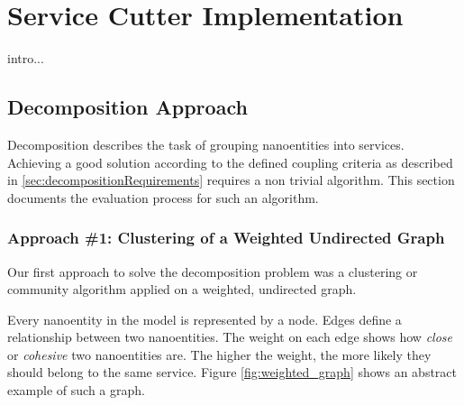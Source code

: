 
\chapter{Service Cutter Implementation}
\label{cha:implementation}

intro...


\section{Decomposition Approach}

Decomposition describes the task of grouping nanoentities into services. Achieving a good solution according to the defined coupling criteria as described in \ref{sec:decompositionRequirements} requires a non trivial algorithm. This section documents the evaluation process for such an algorithm.

\subsection{Approach \#1: Clustering of a Weighted Undirected Graph}
\label{subsec:approach1_graph}

Our first approach to solve the decomposition problem was a clustering or community algorithm applied on a weighted, undirected graph.

Every nanoentity in the model is represented by a node. Edges define a relationship between two nanoentities. The weight on each edge shows how \textit{close} or \textit{cohesive} two nanoentities are. The higher the weight, the more likely they should belong to the same service. Figure \ref{fig:weighted_graph} shows an abstract example of such a graph.

